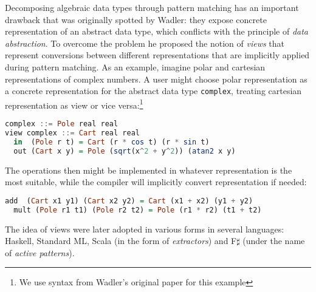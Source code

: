 \documentclass[preprint]{sigplanconf}
\DeclareRobustCommand{\codeocaml}[1]{{\lstinline[breaklines=false,language=Caml]{#1}}}
\begin{document}
Decomposing algebraic data types through pattern matching has an important 
drawback that was originally spotted by Wadler\cite{Wadler87}: they expose 
concrete representation of an abstract data type, which conflicts with the 
principle of \emph{data abstraction}. To overcome the problem he proposed the 
notion of \emph{views} that represent conversions between different 
representations that are implicitly applied during pattern matching. As an 
example, imagine polar and cartesian representations of complex numbers. A user 
might choose polar representation as a concrete representation for the abstract 
data type \codeocaml{complex}, treating cartesian representation as view or vice 
versa:\footnote{We use syntax from Wadler's original paper for this example}

\begin{lstlisting}[language=Haskell,columns=flexible]
complex ::= Pole real real
view complex ::= Cart real real
  in  (Pole r t) = Cart (r * cos t) (r * sin t)
  out (Cart x y) = Pole (sqrt(x^2 + y^2)) (atan2 x y)
\end{lstlisting}

The operations then might be implemented in whatever representation is the most 
suitable, while the compiler will implicitly convert representation if needed:

\begin{lstlisting}[language=Haskell,columns=flexible]
  add  (Cart x1 y1) (Cart x2 y2) = Cart (x1 + x2) (y1 + y2)
  mult (Pole r1 t1) (Pole r2 t2) = Pole (r1 * r2) (t1 + t2)
\end{lstlisting}

The idea of views were later adopted in various forms in several languages: 
Haskell\cite{views96}, Standard ML\cite{views98}, Scala (in the form of 
\emph{extractors}\cite{EmirThesis}) and F$\sharp$ (under the name of 
\emph{active patterns}\cite{Syme07}).

\end{document}
